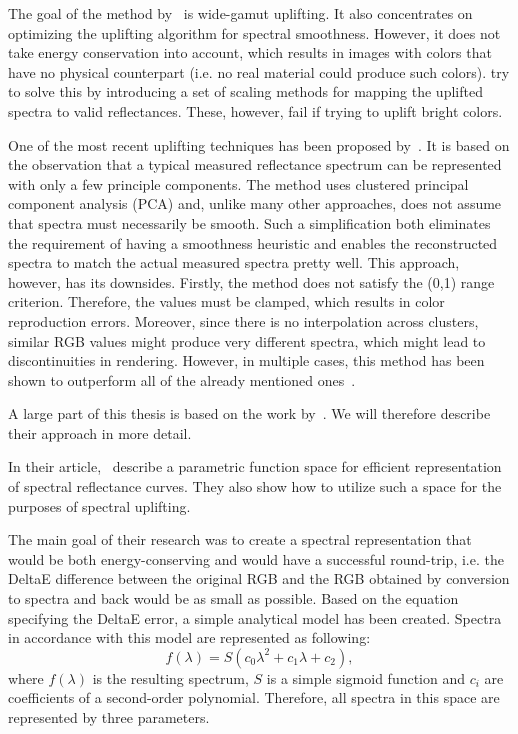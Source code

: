 The goal of the method by~\citet{upsamplingMeng} is wide-gamut uplifting. It also concentrates on optimizing the uplifting algorithm for spectral smoothness. However, it does not take energy conservation into account, which results in images with colors that have no physical counterpart (i.e. no real material could produce such colors). \citet{upsamplingMeng} try to solve this by introducing a set of scaling methods for mapping the uplifted spectra to valid reflectances. These, however, fail if trying to uplift bright colors. 

One of the most recent uplifting techniques has been proposed by~\citet{upsamplingOtsu}. It is based on the observation that a typical measured reflectance spectrum can be represented with only a few principle components. The method uses clustered principal component analysis (PCA) and, unlike many other approaches, does not assume that spectra must necessarily be smooth. Such a simplification both eliminates the requirement of having a smoothness heuristic and enables the reconstructed spectra to match the actual measured spectra pretty well. This approach, however, has its downsides. Firstly, the method does not satisfy the (0,1) range criterion. Therefore, the values must be clamped, which results in color reproduction errors. Moreover, since there is no interpolation across clusters, similar RGB values might produce very different spectra, which might lead to discontinuities in rendering. However, in multiple cases, this method has been shown to outperform all of the already mentioned ones~\cite{upsamplingJakobHanika}.

A large part of this thesis is based on the work by~\citet{upsamplingJakobHanika}. We will therefore describe their approach in more detail.

In their article,~\citet{upsamplingJakobHanika} describe a parametric function space for efficient representation of spectral reflectance curves. They also show how to utilize such a space for the purposes of spectral uplifting.

The main goal of their research was to create a spectral representation that would be both energy-conserving and would have a successful round-trip, i.e. the DeltaE difference between the original RGB and the RGB obtained by conversion to spectra and back would be as small as possible. Based on the equation specifying the DeltaE error, a simple analytical model has been created. Spectra in accordance with this model are represented as following:
\begin{equation} \label{sigmoidRepresentation}
f(\lambda)=S(c_{0}\lambda^2+c_{1}\lambda+c_{2}),
\end{equation}
where $f(\lambda)$ is the resulting spectrum, $S$ is a simple sigmoid function and $c_{i}$ are coefficients of a second-order polynomial. Therefore, all spectra in this space are represented by three parameters.

